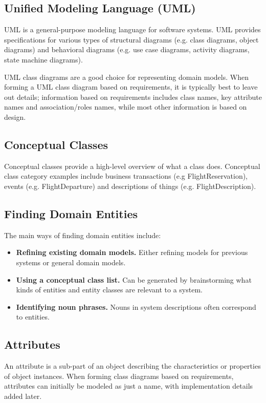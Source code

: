 \documentclass[12pt,titlepage]{article}
\begin{document}
    \subsection{Unified Modeling Language (UML)}
      UML is a general-purpose modeling language for software systems. UML provides specifications for various types of structural diagrams (e.g. class diagrams, object diagrams)
      and behavioral diagrams (e.g. use case diagrams, activity diagrams, state machine diagrams).
      
      UML class diagrams are a good choice for representing domain models. When forming a UML class diagram based on requirements, it is typically best to leave out details;
      information based on requirements includes class names, key attribute names and association/roles names, while most other information is based on design.

    \subsection{Conceptual Classes}
      Conceptual classes provide a high-level overview of what a class does. Conceptual class category examples include business transactions (e.g FlightReservation), events
      (e.g. FlightDeparture) and descriptions of things (e.g. FlightDescription).

    \subsection{Finding Domain Entities}
      The main ways of finding domain entities include:
      \begin{itemize}
        \item \textbf{Refining existing domain models.} Either refining models for previous systems or general domain models.
        \item \textbf{Using a conceptual class list.} Can be generated by brainstorming what kinds of entities and entity classes are relevant to a system.
        \item \textbf{Identifying noun phrases.} Nouns in system descriptions often correspond to entities.
      \end{itemize}

    \subsection{Attributes}
      An attribute is a sub-part of an object describing the characteristics or properties of object instances. When forming class diagrams based on requirements, attributes can
      initially be modeled as just a name, with implementation details added later.
\end{document}
